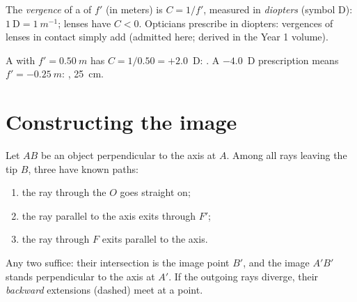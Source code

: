 \begin{definition}[Vergence]\label{def:g11:lenses-and-eye:vergence}
The \emph{vergence} of a  of  $f'$
(in meters) is $C = 1/f'$,
measured in \emph{diopters} (symbol D):
$1~\text{D} = \qty{1}{m^{-1}}$;  lenses have $C < 0$.
Opticians prescribe in diopters: vergences of  lenses in contact
simply add (admitted here; derived in the Year 1 volume).
\end{definition}

\begin{example}\label{ex:g11:lenses-and-eye:vergence}
A  with $f' = \qty{0.50}{m}$ has $C = 1/0.50 = +2.0$~D:
. A $-4.0$~D prescription means $f' = \qty{-0.25}{m}$:
,  \qty{25}{cm}.
\end{example}

\section{Constructing the image}

\begin{method}\label{met:g11:lenses-and-eye:rays}
Let $AB$ be an object perpendicular to the axis at $A$. Among all rays
leaving the tip $B$, three have known paths:
\begin{enumerate}
  \item the ray through the  $O$ goes straight on;
  \item the ray parallel to the axis exits through $F'$;
  \item the ray through $F$ exits parallel to the axis.
\end{enumerate}
Any two suffice: their intersection is the image point $B'$, and the
image $A'B'$ stands perpendicular to the axis at $A'$. If the outgoing
rays diverge, their \emph{backward} extensions (dashed) meet at a
 point.
\end{method}

